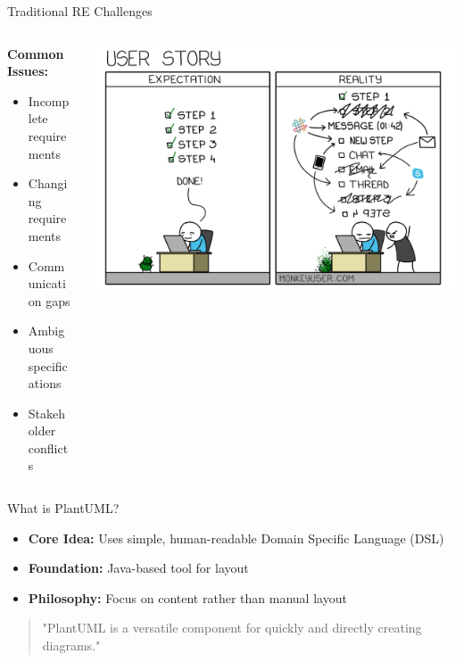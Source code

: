 \documentclass{beamer}
\begin{document}
\begin{frame}{Traditional RE Challenges}
    \begin{columns}
        \begin{column}{0.5\textwidth}
            \textbf{Common Issues:}
            \begin{itemize}
                \item Incomplete requirements
                \item Changing requirements
                \item Communication gaps
                \item Ambiguous specifications
                \item Stakeholder conflicts
            \end{itemize}
        \end{column}
        \begin{column}{0.5\textwidth}
            \centering
            \includegraphics[width=\textwidth]{images/162-user-story.png} %
        \end{column}
    \end{columns}
\end{frame}

\begin{frame}{What is PlantUML?}
    \begin{itemize}
        \item \textbf{Core Idea:} Uses simple, human-readable Domain Specific Language (DSL)
        \item \textbf{Foundation:} Java-based tool for layout
        \item \textbf{Philosophy:} Focus on content rather than manual layout
    \end{itemize}
    
    \begin{quote}
        "PlantUML is a versatile component for quickly and directly creating diagrams."
    \end{quote}
\end{frame}
\end{document}
